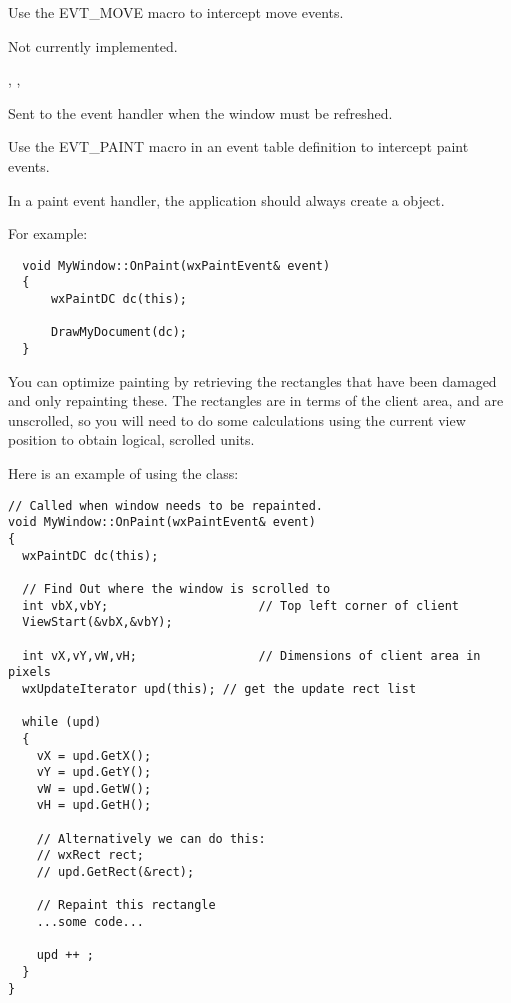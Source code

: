 
Use the EVT\_MOVE macro to intercept move events.


Not currently implemented.


,\rtfsp
{},\rtfsp
{}

\label{wxwindowonpaint}


Sent to the event handler when the window must be refreshed.




Use the EVT\_PAINT macro in an event table definition to intercept paint events.

In a paint event handler, the application should always create a  object.

For example:

\small{%
\begin{verbatim}
  void MyWindow::OnPaint(wxPaintEvent& event)
  {
      wxPaintDC dc(this);

      DrawMyDocument(dc);
  }
\end{verbatim}
}%

You can optimize painting by retrieving the rectangles
that have been damaged and only repainting these. The rectangles are in
terms of the client area, and are unscrolled, so you will need to do
some calculations using the current view position to obtain logical,
scrolled units.

Here is an example of using the  class:

{\small%
\begin{verbatim}
// Called when window needs to be repainted.
void MyWindow::OnPaint(wxPaintEvent& event)
{
  wxPaintDC dc(this);

  // Find Out where the window is scrolled to
  int vbX,vbY;                     // Top left corner of client
  ViewStart(&vbX,&vbY);

  int vX,vY,vW,vH;                 // Dimensions of client area in pixels
  wxUpdateIterator upd(this); // get the update rect list

  while (upd)
  {
    vX = upd.GetX();
    vY = upd.GetY();
    vW = upd.GetW();
    vH = upd.GetH();

    // Alternatively we can do this:
    // wxRect rect;
    // upd.GetRect(&rect);

    // Repaint this rectangle
    ...some code...

    upd ++ ;
  }
}
\end{verbatim}
}%

